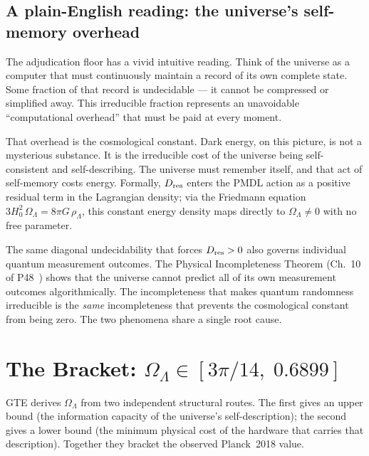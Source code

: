 \documentclass[11pt,a4paper]{article}
\newcommand{\OmL}{\Omega_\Lambda}
\newcommand{\Dres}{D_{\rm res}}
\begin{document}
\subsection{A plain-English reading: the universe's self-memory overhead}

The adjudication floor has a vivid intuitive reading.  Think of the universe as
a computer that must continuously maintain a record of its own complete state.
Some fraction of that record is undecidable --- it cannot be compressed or
simplified away.  This irreducible fraction represents an unavoidable
``computational overhead'' that must be paid at every moment.

That overhead is the cosmological constant.  Dark energy, on this picture, is
not a mysterious substance.  It is the irreducible cost of the universe being
self-consistent and self-describing.  The universe must remember itself, and
that act of self-memory costs energy.  Formally, $D_{\rm res}$ enters the PMDL
action as a positive residual term in the Lagrangian density; via the Friedmann
equation $3H_0^2\,\OmL = 8\pi G\,\rho_\Lambda$, this constant energy density
maps directly to $\OmL \neq 0$ with no free parameter.

\begin{tcolorbox}[colback=boxyellow,colframe=yellow!60!black,
  title={Why the same incompleteness drives quantum measurement}]
The same diagonal undecidability that forces $\Dres > 0$ also governs
individual quantum measurement outcomes.  The Physical Incompleteness Theorem
(Ch.~10 of P48~\cite{SpivackGTECompleteFramework}) shows that the universe cannot predict all of its own measurement
outcomes algorithmically.  The incompleteness that makes quantum randomness
irreducible is the \emph{same} incompleteness that prevents the cosmological
constant from being zero.  The two phenomena share a single root cause.
\end{tcolorbox}

\section{The Bracket: \texorpdfstring{$\Omega_\Lambda \in [3\pi/14,\;0.6899]$}
{Omega\_Lambda in [3pi/14, 0.6899]}}
\label{sec:bracket}

\begin{tcolorbox}[colback=boxblue,colframe=blue!40!black,
  title={Key idea}]
GTE derives $\OmL$ from two independent structural routes.  The first gives an
upper bound (the information capacity of the universe's self-description); the
second gives a lower bound (the minimum physical cost of the hardware that
carries that description).  Together they bracket the observed Planck~2018 value.
\end{tcolorbox}
\end{document}
